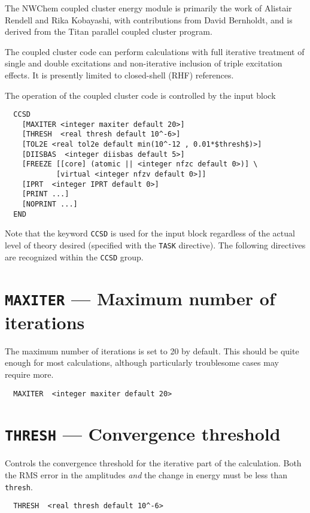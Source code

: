 \label{sec:ccsd}

The NWChem coupled cluster energy module is primarily the work of
Alistair Rendell and Rika Kobayashi, with contributions from David
Bernholdt, and is derived from the Titan parallel coupled cluster
program.

The coupled cluster code can perform calculations with full iterative
treatment of single and double excitations and non-iterative inclusion
of triple excitation effects.  It is presently limited to closed-shell
(RHF) references.

The operation of the coupled cluster code is controlled by the input
block
\begin{verbatim}
  CCSD
    [MAXITER <integer maxiter default 20>]
    [THRESH  <real thresh default 10^-6>]
    [TOL2E <real tol2e default min(10^-12 , 0.01*$thresh$)>]
    [DIISBAS  <integer diisbas default 5>]
    [FREEZE [[core] (atomic || <integer nfzc default 0>)] \
            [virtual <integer nfzv default 0>]]
    [IPRT  <integer IPRT default 0>]
    [PRINT ...]
    [NOPRINT ...]
  END
\end{verbatim}
Note that the keyword \verb+CCSD+ is used for the input block
regardless of the actual level of theory desired (specified with the
\verb+TASK+ directive).  The following directives are recognized
within the \verb+CCSD+ group.

\section{{\tt MAXITER} --- Maximum number of iterations}

The maximum number of iterations is set to 20 by default.  This should
be quite enough for most calculations, although particularly
troublesome cases may require more.

\begin{verbatim}
  MAXITER  <integer maxiter default 20>
\end{verbatim}

\section{{\tt THRESH} --- Convergence threshold}

Controls the convergence threshold for the iterative part of the
calculation.  Both the RMS error in the amplitudes {\em and} the
change in energy must be less than {\tt thresh}.

\begin{verbatim}
  THRESH  <real thresh default 10^-6>
\end{verbatim}

